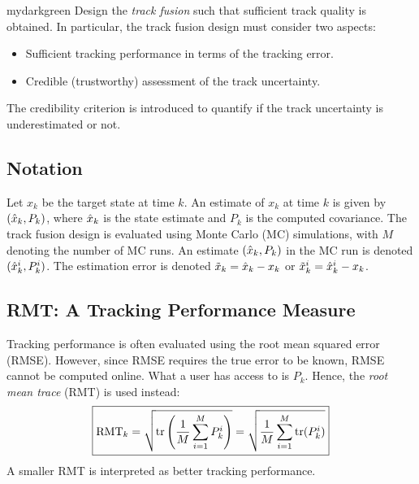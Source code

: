 \documentclass[a0paper,portrait,twocols]{def/LiUposter} %
\begin{document}
{\begin{minipage}{\columnwidth}
\begin{mybox}[title={Problem}]{mydarkgreen}
Design the \emph{track fusion} such that sufficient track quality is obtained. In particular, the track fusion design must consider two aspects:
\begin{itemize}
	\item Sufficient tracking performance in terms of the tracking error.
	\item Credible (trustworthy) assessment of the track uncertainty.
\end{itemize}
\end{mybox}
The credibility criterion is introduced to quantify if the track uncertainty is underestimated or not.



\subsection{Notation}

Let $x_k$ be the target state at time $k$. An estimate of $x_k$ at time $k$ is given by $(\hat{x}_k,P_k)$, where $\hat{x}_k$ is the state estimate and $P_k$ is the computed covariance. The track fusion design is evaluated using Monte Carlo (MC) simulations, with $M$ denoting the number of MC runs. An estimate $(\hat{x}_k,P_k)$ in the \ith MC run is denoted $(\hat{x}_k^i,P_k^i)$. The estimation error is denoted $\tilde{x}_k=\hat{x}_k-x_k$ or $\tilde{x}_k^i=\hat{x}_k^i-x_k$.




\end{minipage} %





      
\begin{minipage}{\columnwidth}


\vspace{-3em}



\subsection{RMT: A Tracking Performance Measure}

Tracking performance is often evaluated using the root mean squared error (RMSE). However, since RMSE requires the true error to be known, RMSE cannot be computed online. What a user has access to is $P_k$. Hence, the \emph{root mean trace} (RMT) is used instead:
\begin{equation*}
	\boxed{\text{RMT}_k = \sqrt{\operatorname*{\rm tr}\left(\frac{1}{M}\sum_{i=1}^M P_k^i\right)} = \sqrt{\frac{1}{M}\sum_{i=1}^M \operatorname*{\rm tr}(P_k^i)}}
\end{equation*}
A smaller RMT is interpreted as better tracking performance.
 




\end{minipage}}
\end{document}
